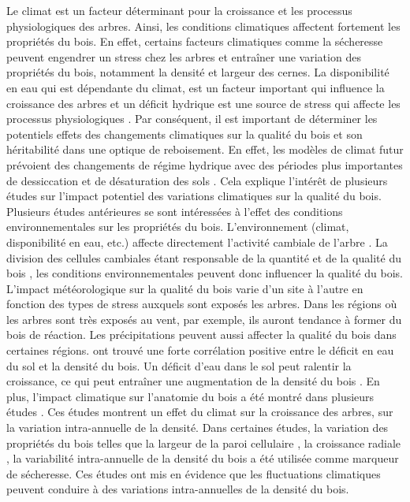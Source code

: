 \documentclass{report}
\begin{document}
Le climat est un facteur déterminant pour la croissance et les processus physiologiques des arbres. Ainsi, les conditions climatiques affectent fortement les propriétés du bois. En effet, certains facteurs climatiques comme la sécheresse peuvent engendrer un stress chez les arbres et entraîner une variation des propriétés du bois, notamment la densité et largeur des cernes. La disponibilité en eau qui est dépendante du climat, est un facteur important qui influence la croissance des arbres \citep{Lebourgeois2005} et un déficit hydrique est une source de stress qui affecte les processus physiologiques \citep{Waring1987}. Par conséquent, il est important de déterminer les potentiels effets des changements climatiques sur la qualité du bois et son héritabilité dans une optique de reboisement. En effet, les modèles de climat futur prévoient des changements de régime hydrique avec des périodes plus importantes de dessiccation et de désaturation des sols \citep{IPCC_2015}. Cela explique l'intérêt de plusieurs études sur l'impact potentiel des variations climatiques sur la qualité du bois. \\

Plusieurs études antérieures se sont intéressées à l'effet des conditions environnementales sur les propriétés du bois. L'environnement (climat, disponibilité en eau, etc.) affecte directement l'activité cambiale de l'arbre \citep{FRITTS1976,Kozlowski1997}. La division des cellules cambiales étant responsable de la quantité et de la qualité du bois \citep{Begum2013}, les conditions environnementales peuvent donc influencer la qualité du bois. L'impact météorologique sur la qualité du bois varie d'un site à l'autre en fonction des types de stress auxquels sont exposés les arbres. Dans les régions où les arbres sont très exposés au vent, par exemple, ils auront tendance à former du bois de réaction. Les précipitations peuvent aussi affecter la qualité du bois dans certaines régions. \cite{Bouriaud2005} ont trouvé une forte corrélation positive entre le déficit en eau du sol et la densité du bois. Un déficit d'eau dans le sol peut ralentir la croissance, ce qui peut entraîner une augmentation de la densité du bois \citep{GARDINER2011}. En plus, l'impact climatique sur l'anatomie du bois a été montré dans plusieurs études \citep{Bouriaud2005,Fritts2001,Campelo2013}. Ces études montrent un effet du climat sur la croissance des arbres, sur la variation intra-annuelle de la densité. Dans certaines études, la variation des propriétés du bois telles que la largeur de la paroi cellulaire \citep{Fritts2001}, la croissance radiale \citep{Jyske2009}, la variabilité intra-annuelle de la densité du bois \citep{Wimmer2000,Rigling2001,Wilkinson2015} a été utilisée comme marqueur de sécheresse. Ces études ont mis en évidence que les fluctuations climatiques peuvent conduire à des variations intra-annuelles de la densité du bois. \\
\end{document}
